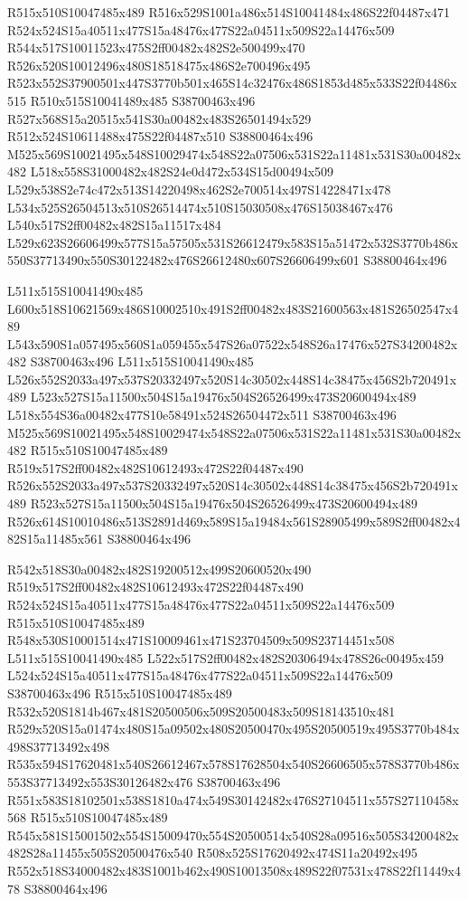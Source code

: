 \documentclass{article}
\begin{document}
\begin{multicols}{2}
R515x510S10047485x489 R516x529S1001a486x514S10041484x486S22f04487x471 R524x524S15a40511x477S15a48476x477S22a04511x509S22a14476x509 R544x517S10011523x475S2ff00482x482S2e500499x470 R526x520S10012496x480S18518475x486S2e700496x495 R523x552S37900501x447S3770b501x465S14c32476x486S1853d485x533S22f04486x515 R510x515S10041489x485 S38700463x496 R527x568S15a20515x541S30a00482x483S26501494x529 R512x524S10611488x475S22f04487x510 S38800464x496 M525x569S10021495x548S10029474x548S22a07506x531S22a11481x531S30a00482x482 L518x558S31000482x482S24e0d472x534S15d00494x509 L529x538S2e74c472x513S14220498x462S2e700514x497S14228471x478 L534x525S26504513x510S26514474x510S15030508x476S15038467x476 L540x517S2ff00482x482S15a11517x484 L529x623S26606499x577S15a57505x531S26612479x583S15a51472x532S3770b486x550S37713490x550S30122482x476S26612480x607S26606499x601 S38800464x496

L511x515S10041490x485 L600x518S10621569x486S10002510x491S2ff00482x483S21600563x481S26502547x489 L543x590S1a057495x560S1a059455x547S26a07522x548S26a17476x527S34200482x482 S38700463x496 L511x515S10041490x485 L526x552S2033a497x537S20332497x520S14c30502x448S14c38475x456S2b720491x489 L523x527S15a11500x504S15a19476x504S26526499x473S20600494x489 L518x554S36a00482x477S10e58491x524S26504472x511 S38700463x496 M525x569S10021495x548S10029474x548S22a07506x531S22a11481x531S30a00482x482 R515x510S10047485x489 R519x517S2ff00482x482S10612493x472S22f04487x490 R526x552S2033a497x537S20332497x520S14c30502x448S14c38475x456S2b720491x489 R523x527S15a11500x504S15a19476x504S26526499x473S20600494x489 R526x614S10010486x513S2891d469x589S15a19484x561S28905499x589S2ff00482x482S15a11485x561 S38800464x496

R542x518S30a00482x482S19200512x499S20600520x490 R519x517S2ff00482x482S10612493x472S22f04487x490 R524x524S15a40511x477S15a48476x477S22a04511x509S22a14476x509 R515x510S10047485x489 R548x530S10001514x471S10009461x471S23704509x509S23714451x508 L511x515S10041490x485 L522x517S2ff00482x482S20306494x478S26c00495x459 L524x524S15a40511x477S15a48476x477S22a04511x509S22a14476x509 S38700463x496 R515x510S10047485x489 R532x520S1814b467x481S20500506x509S20500483x509S18143510x481 R529x520S15a01474x480S15a09502x480S20500470x495S20500519x495S3770b484x498S37713492x498 R535x594S17620481x540S26612467x578S17628504x540S26606505x578S3770b486x553S37713492x553S30126482x476 S38700463x496 R551x583S18102501x538S1810a474x549S30142482x476S27104511x557S27110458x568 R515x510S10047485x489 R545x581S15001502x554S15009470x554S20500514x540S28a09516x505S34200482x482S28a11455x505S20500476x540 R508x525S17620492x474S11a20492x495 R552x518S34000482x483S1001b462x490S10013508x489S22f07531x478S22f11449x478 S38800464x496


\end{multicols}
\end{document}
